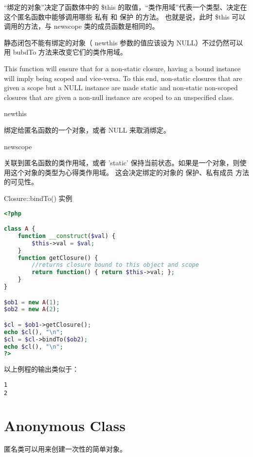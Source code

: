 “绑定的对象”决定了函数体中的 \$this 的取值，“类作用域”代表一个类型、决定在这个匿名函数中能够调用哪些 私有 和 保护 的方法。 也就是说，此时 \$this 可以调用的方法，与 newscope 类的成员函数是相同的。

静态闭包不能有绑定的对象（ newthis 参数的值应该设为 NULL）不过仍然可以用 bubdTo 方法来改变它们的类作用域。

This function will ensure that for a non-static closure, having a bound instance will imply being scoped and vice-versa. To this end, non-static closures that are given a scope but a NULL instance are made static and non-static non-scoped closures that are given a non-null instance are scoped to an unspecified class.

\begin{compactitem}
\item newthis

绑定给匿名函数的一个对象，或者 NULL 来取消绑定。
\item newscope

关联到匿名函数的类作用域，或者 'static' 保持当前状态。如果是一个对象，则使用这个对象的类型为心得类作用域。 这会决定绑定的对象的 保护、私有成员 方法的可见性。
\end{compactitem}


\begin{example}
Closure::bindTo() 实例
\begin{lstlisting}[language=PHP]
<?php

class A {
    function __construct($val) {
        $this->val = $val;
    }
    function getClosure() {
        //returns closure bound to this object and scope
        return function() { return $this->val; };
    }
}

$ob1 = new A(1);
$ob2 = new A(2);

$cl = $ob1->getClosure();
echo $cl(), "\n";
$cl = $cl->bindTo($ob2);
echo $cl(), "\n";
?>
\end{lstlisting}
\end{example}

以上例程的输出类似于：

\begin{verbatim}
1
2
\end{verbatim}

\chapter{Anonymous Class}

匿名类可以用来创建一次性的简单对象。

